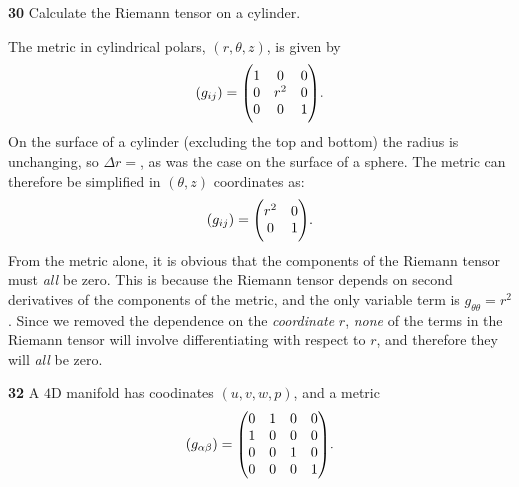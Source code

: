 \documentclass[gr-notes.tex]{subfiles}
\begin{document}
\textbf{30}
Calculate the Riemann tensor on a cylinder.

The metric in cylindrical polars, $(r,\theta,z)$, is given by
%
\begin{displaymath}
  (g_{ij}) = \mqty(\dmat[0]{1,r^2,1}).
\end{displaymath}
%
On the surface of a cylinder (excluding the top and bottom) the radius is unchanging, so $\Delta r = $, as was the case on the surface of a sphere. The metric can therefore be simplified in $(\theta,z)$ coordinates as:
%
\begin{displaymath}
  (g_{ij}) = \mqty(\dmat[0]{r^2,1}).
\end{displaymath}
%
From the metric alone, it is obvious that the components of the Riemann tensor must \emph{all} be zero. This is because the Riemann tensor depends on second derivatives of the components of the metric, and the only variable term is $g_{\theta\theta} = r^2$. Since we removed the dependence on the \emph{coordinate} $r$, \emph{none} of the terms in the Riemann tensor will involve differentiating with respect to $r$, and therefore they will \emph{all} be zero.


\textbf{32}
A $4$D manifold has coodinates $(u,v,w,p)$, and a metric
%
\begin{displaymath}
  (g_{\alpha\beta}) =
  \mqty( 0 & 1 & 0 & 0 \\
         1 & 0 & 0 & 0 \\
         0 & 0 & 1 & 0 \\
         0 & 0 & 0 & 1 ).
\end{displaymath}
\end{document}
